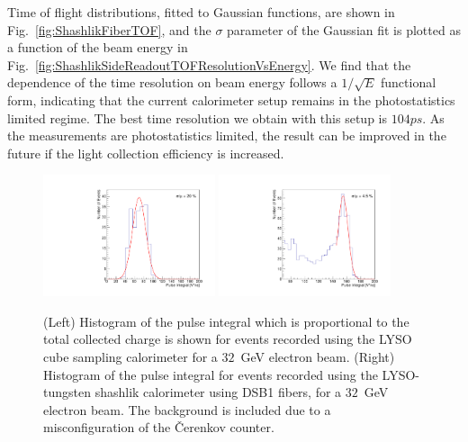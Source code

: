 Time of flight distributions, fitted to Gaussian functions,
are shown in Fig.~\ref{fig:ShashlikFiberTOF}, and the 
$\sigma$ parameter of the Gaussian fit is plotted as a function of the
beam energy in Fig.~\ref{fig:ShashlikSideReadoutTOFResolutionVsEnergy}.
We find that the dependence of the time resolution on
beam energy follows a $1/\sqrt{E}$ functional form, indicating
that the current calorimeter setup remains in the photostatistics limited regime. 
The best time resolution we obtain with this setup is $104\unit{ps}$. As the measurements are 
photostatistics limited, the result can be improved in the future if the light collection
efficiency is increased.


\begin{figure}[H] \centering
\includegraphics[width=0.45\textwidth]{figs/timing/TOF_Electron_LYSOCube_32GeV_energy} 
\includegraphics[width=0.45\textwidth]{figs/timing/TOF_ShashlikDSB1Fiber_Electron_32GeV_energy} 
\caption{ (Left) Histogram of the pulse integral which is proportional to the
total collected charge is shown for events recorded using the LYSO cube sampling
calorimeter for a $32$~GeV electron beam. (Right) Histogram of the pulse
integral for events recorded using the LYSO-tungsten shashlik calorimeter using
DSB1 fibers, for a $32$~GeV electron beam. The background is included due to a
misconfiguration of the \v{C}erenkov counter. } 
\label{fig:ShashlikFiberEnergy32GeV}
\end{figure}



